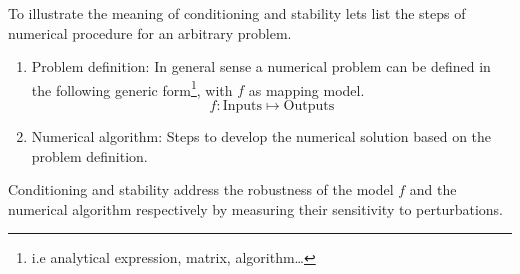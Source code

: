 \documentclass[../main.tex]{subfiles}
\begin{document}
	
	\par To illustrate the meaning of conditioning and stability lets list the steps of numerical procedure for an arbitrary problem. 
		
		\begin{enumerate}
			\item Problem definition: In general sense a numerical problem can be defined in the following generic form\footnote{i.e analytical expression, matrix, algorithm\dots}, with $f$ as mapping model. \\
				\begin{equation*} 
					f : \text{Inputs} \mapsto \text{Outputs}
				\end{equation*}
			\item Numerical algorithm: Steps to develop the numerical solution based on the problem definition.
		\end{enumerate}

		\par Conditioning and stability address the robustness of the model $f$ and the numerical algorithm respectively by measuring their sensitivity to perturbations.
	
\end{document}
